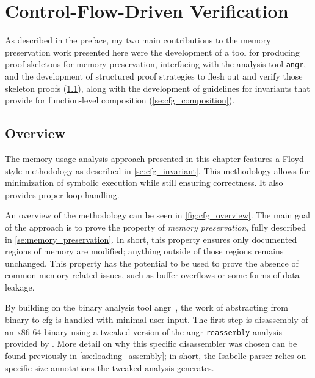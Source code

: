 \chapter{Control-Flow-Driven Verification}\label{ch:cfg}
As described in the preface,
my two main contributions to the memory preservation work presented here
were the development of a tool for producing proof skeletons
for memory preservation, interfacing with the analysis tool \texttt{angr},
and the development of structured proof strategies
to flesh out and verify those skeleton proofs (\cref{se:cfg_overview}),
along with the development of guidelines
for invariants that provide for function-level composition
(\cref{se:cfg_composition}).


\section{Overview}\label{se:cfg_overview}
The memory usage analysis approach presented in this chapter
features a Floyd-style methodology as described in \cref{se:cfg_invariant}.
This methodology allows for minimization of symbolic execution%
 while still ensuring correctness.
It also provides proper loop handling.

An overview of the methodology can be seen in \cref{fig:cfg_overview}.
The main goal of the approach is to prove the property of \emph{memory preservation},%
fully described in \cref{se:memory_preservation}.
In short, this property ensures only documented regions of memory are modified;%
anything outside of those regions remains unchanged.
This property has the potential to be used
to prove the absence of common memory-related issues,
such as buffer overflows or some forms of data leakage.

By building on the binary analysis tool angr~\citep{shoshitaishvili2016state},%
the work of abstracting from binary to \ac{cfg} is handled with minimal user input.
The first step is disassembly of an x86-64 binary using%
a tweaked version of the angr
\lstinline|reassembly| analysis~\citep{wang2017ramblr}
provided by \citet{roessle2019}.%
More detail on why this specific disassembler was chosen
can be found previously in \cref{sse:loading_assembly}; in short,
the Isabelle parser relies on specific size annotations the tweaked analysis generates.

